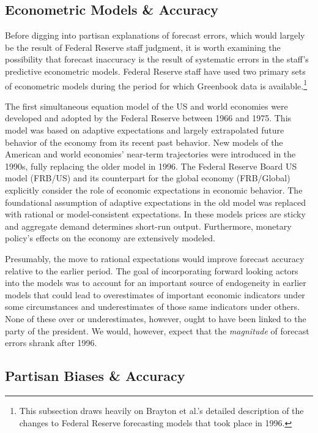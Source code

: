 \documentclass[a4paper]{article}\usepackage{graphicx, color}
\begin{document}
\subsection{Econometric Models \& Accuracy}

Before digging into partisan explanations of forecast errors, which would largely be the result of Federal Reserve staff judgment, it is worth examining the possibility that forecast inaccuracy is the result of systematic errors in the staff's predictive econometric models. Federal Reserve staff have used two primary sets of econometric models during the period for which Greenbook data is available.\footnote{This subsection draws heavily on Brayton et al.'s \citeyear{Brayton1997} detailed description of the changes to Federal Reserve forecasting models that took place in 1996.} 

The first simultaneous equation model of the US and world economies were developed and adopted by the Federal Reserve between 1966 and 1975. This model was based on adaptive expectations and largely extrapolated future behavior of the economy from its recent past behavior. New models of the American and world economies' near-term trajectories were introduced in the 1990s, fully replacing the older model in 1996. The Federal Reserve Board US model (FRB/US) and its counterpart for the global economy (FRB/Global) explicitly consider the role of economic expectations in economic behavior. The foundational assumption of adaptive expectations in the old model was replaced with rational or model-consistent expectations. In these models prices are sticky and aggregate demand determines short-run output. Furthermore, monetary policy's effects on the economy are extensively modeled. 

Presumably, the move to rational expectations would improve forecast accuracy relative to the earlier period. The goal of incorporating forward looking actors into the models was to account for an important source of endogeneity in earlier models that could lead to overestimates of important economic indicators under some circumstances and underestimates of those same indicators under others. None of these over or underestimates, however, ought to have been linked to the party of the president. We would, however, expect that the \emph{magnitude} of forecast errors shrank after 1996.

\subsection{Partisan Biases \& Accuracy}
\end{document}
